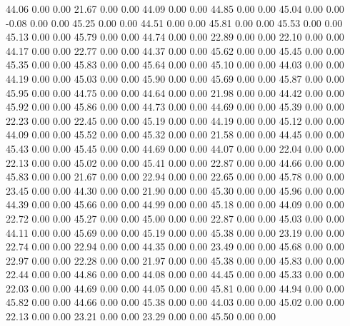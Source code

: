    44.06   0.00   0.00
   21.67   0.00   0.00
   44.09   0.00   0.00
   44.85   0.00   0.00
   45.04   0.00   0.00
   -0.08   0.00   0.00
   45.25   0.00   0.00
   44.51   0.00   0.00
   45.81   0.00   0.00
   45.53   0.00   0.00
   45.13   0.00   0.00
   45.79   0.00   0.00
   44.74   0.00   0.00
   22.89   0.00   0.00
   22.10   0.00   0.00
   44.17   0.00   0.00
   22.77   0.00   0.00
   44.37   0.00   0.00
   45.62   0.00   0.00
   45.45   0.00   0.00
   45.35   0.00   0.00
   45.83   0.00   0.00
   45.64   0.00   0.00
   45.10   0.00   0.00
   44.03   0.00   0.00
   44.19   0.00   0.00
   45.03   0.00   0.00
   45.90   0.00   0.00
   45.69   0.00   0.00
   45.87   0.00   0.00
   45.95   0.00   0.00
   44.75   0.00   0.00
   44.64   0.00   0.00
   21.98   0.00   0.00
   44.42   0.00   0.00
   45.92   0.00   0.00
   45.86   0.00   0.00
   44.73   0.00   0.00
   44.69   0.00   0.00
   45.39   0.00   0.00
   22.23   0.00   0.00
   22.45   0.00   0.00
   45.19   0.00   0.00
   44.19   0.00   0.00
   45.12   0.00   0.00
   44.09   0.00   0.00
   45.52   0.00   0.00
   45.32   0.00   0.00
   21.58   0.00   0.00
   44.45   0.00   0.00
   45.43   0.00   0.00
   45.45   0.00   0.00
   44.69   0.00   0.00
   44.07   0.00   0.00
   22.04   0.00   0.00
   22.13   0.00   0.00
   45.02   0.00   0.00
   45.41   0.00   0.00
   22.87   0.00   0.00
   44.66   0.00   0.00
   45.83   0.00   0.00
   21.67   0.00   0.00
   22.94   0.00   0.00
   22.65   0.00   0.00
   45.78   0.00   0.00
   23.45   0.00   0.00
   44.30   0.00   0.00
   21.90   0.00   0.00
   45.30   0.00   0.00
   45.96   0.00   0.00
   44.39   0.00   0.00
   45.66   0.00   0.00
   44.99   0.00   0.00
   45.18   0.00   0.00
   44.09   0.00   0.00
   22.72   0.00   0.00
   45.27   0.00   0.00
   45.00   0.00   0.00
   22.87   0.00   0.00
   45.03   0.00   0.00
   44.11   0.00   0.00
   45.69   0.00   0.00
   45.19   0.00   0.00
   45.38   0.00   0.00
   23.19   0.00   0.00
   22.74   0.00   0.00
   22.94   0.00   0.00
   44.35   0.00   0.00
   23.49   0.00   0.00
   45.68   0.00   0.00
   22.97   0.00   0.00
   22.28   0.00   0.00
   21.97   0.00   0.00
   45.38   0.00   0.00
   45.83   0.00   0.00
   22.44   0.00   0.00
   44.86   0.00   0.00
   44.08   0.00   0.00
   44.45   0.00   0.00
   45.33   0.00   0.00
   22.03   0.00   0.00
   44.69   0.00   0.00
   44.05   0.00   0.00
   45.81   0.00   0.00
   44.94   0.00   0.00
   45.82   0.00   0.00
   44.66   0.00   0.00
   45.38   0.00   0.00
   44.03   0.00   0.00
   45.02   0.00   0.00
   22.13   0.00   0.00
   23.21   0.00   0.00
   23.29   0.00   0.00
   45.50   0.00   0.00
